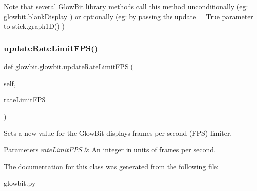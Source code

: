Note that several Glow\+Bit library methods call this method unconditionally (eg\+: glowbit.\+blank\+Display ) or optionally (eg\+: by passing the update = True parameter to stick.\+graph1\+D() ) \mbox{\label{classglowbit_1_1glowbit_a7f72cb0878a688aa6181d4632428da09}} 
\subsubsection{\texorpdfstring{update\+Rate\+Limit\+F\+P\+S()}{updateRateLimitFPS()}}
{\footnotesize\ttfamily def glowbit.\+glowbit.\+update\+Rate\+Limit\+F\+PS (\begin{DoxyParamCaption}\item[{}]{self,  }\item[{}]{rate\+Limit\+F\+PS }\end{DoxyParamCaption})}



Sets a new value for the Glow\+Bit display\textquotesingle{}s frames per second (F\+PS) limiter. 


\begin{DoxyParams}{Parameters}
{\em rate\+Limit\+F\+PS} & An integer in units of frames per second. \\
\hline
\end{DoxyParams}


The documentation for this class was generated from the following file\+:\begin{DoxyCompactItemize}
\item 
glowbit.\+py\end{DoxyCompactItemize}
